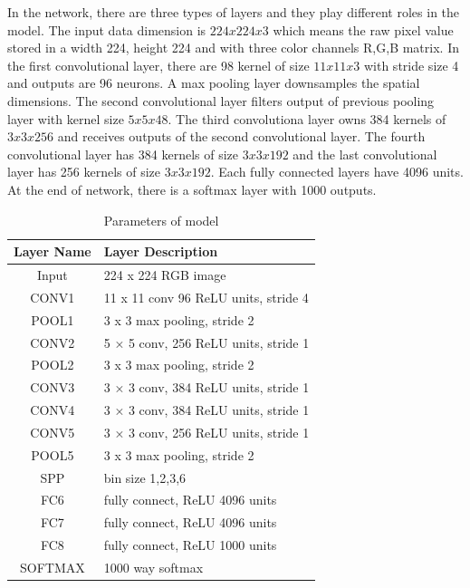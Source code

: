 In the network, there are three types of layers and they play different roles in the model. The input data dimension is $224x224x3$ which means the raw pixel value stored in a width 224, height 224 and with three color channels R,G,B matrix. In the first convolutional layer, there are 98 kernel of size $11x11x3$ with stride size 4 and outputs are 96 neurons. A max pooling layer downsamples the spatial dimensions. The second convolutional layer filters output of previous pooling layer with kernel size $5x5x48$. The third convolutiona layer owns 384 kernels of $3x3x256$ and receives outputs of the second convolutional layer. The fourth convolutional layer has 384 kernels of size $3x3x192$ and the last convolutional layer has 256 kernels of size $3x3x192$. Each fully connected layers have 4096 units. At the end of network, there is a softmax layer with 1000 outputs.
\begin{table}[h]
\begin{center}
    \begin{tabular}{ | c | p{8cm} | }
    \hline
    Layer Name & Layer Description \\ \hline
    Input & 224 x 224 RGB image \\ \hline
    CONV1 & 11 x 11 conv 96 ReLU units, stride 4 \\ \hline
    POOL1 & 3 x 3 max pooling, stride 2 \\ \hline
    CONV2 & 5 × 5 conv, 256 ReLU units, stride 1 \\ \hline
    POOL2 & 3 x 3 max pooling, stride 2 \\ \hline
    CONV3 & 3 × 3 conv, 384 ReLU units, stride 1 \\ \hline
    CONV4 & 3 × 3 conv, 384 ReLU units, stride 1 \\ \hline
    CONV5 & 3 × 3 conv, 256 ReLU units, stride 1 \\ \hline
    POOL5 & 3 x 3 max pooling, stride 2 \\ \hline
    SPP & bin size 1,2,3,6 \\ \hline
    FC6 & fully connect, ReLU 4096 units\\ \hline
    FC7 & fully connect, ReLU 4096 units\\ \hline
    FC8 & fully connect, ReLU 1000 units\\ \hline
    SOFTMAX & 1000 way softmax\\ \hline
    \end{tabular}
    \caption{Parameters of model}
    \label{fig:NetPara}
\end{center}
\end{table}

















